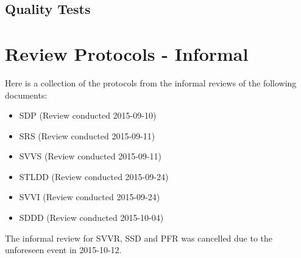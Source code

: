 \documentclass[a4paper]{article}
\begin{document}
\subsection{Quality Tests}




\newpage
\section{Review Protocols - Informal}
Here is a collection of the protocols from the informal reviews of the following documents:

\begin{itemize}
\item SDP (Review conducted 2015-09-10)
\item SRS (Review conducted 2015-09-11)
\item SVVS (Review conducted 2015-09-11)
\item STLDD (Review conducted 2015-09-24)
\item SVVI (Review conducted 2015-09-24)
\item SDDD (Review conducted 2015-10-04)
\end{itemize}

The informal review for SVVR, SSD and PFR was cancelled due to the unforeseen event in 2015-10-12.











\end{document}
